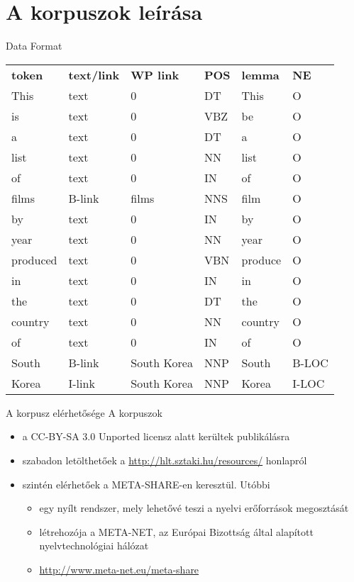 \documentclass[utf8x,t]{beamer}
\newcommand{\vitem}{\item \vspace{4pt}}
\begin{document}
\section{A korpuszok leírása}

\begin{frame}{Data Format}

\begin{tabular}{llllll}
\textbf{token} & \textbf{text/link} & \textbf{WP link} & \textbf{POS} & \textbf{lemma} & \textbf{NE} \\
This & text & 0 &    DT &   This & O \\
is &   text & 0 &    VBZ &  be &   O \\
a &    text & 0 &    DT &   a  &    O\\
list & text & 0 &    NN &   list  & O\\
of &   text & 0 &    IN &   of &     O\\
films  & B-link & films &  NNS &  film & O\\
by &   text & 0 &    IN &   by &     O\\
year & text & 0 &    NN &   year & O\\
produced & text & 0 &    VBN &  produce & O\\
in &   text & 0 &    IN &   in &     O\\
the &  text & 0 &    DT &   the &   O\\
country &text & 0 &    NN &   country &O\\
of &   text & 0 &    IN &   of &     O\\
South &  B-link & South Korea &  NNP &  South  &B-LOC\\
Korea &  I-link & South Korea &  NNP &  Korea   & I-LOC\\
\end{tabular}

\end{frame}

\begin{frame}{A korpusz elérhetősége}
\bigskip
A korpuszok
\begin{itemize}
\vitem a CC-BY-SA 3.0 Unported licensz alatt kerültek publikálásra
\vitem szabadon letölthetőek a \url{http://hlt.sztaki.hu/resources/} honlapról
\vitem szintén elérhetőek a META-SHARE-en keresztül. Utóbbi
  \begin{itemize}
  \vitem egy nyílt rendszer, mely lehetővé teszi a nyelvi erőforrások megosztását
  \vitem létrehozója a META-NET, az Európai Bizottság által alapított nyelvtechnológiai hálózat
  \vitem \url{http://www.meta-net.eu/meta-share}
  \end{itemize}
\end{itemize}

\end{frame}
\end{document}
